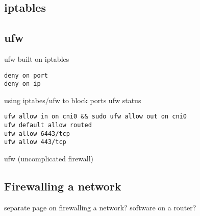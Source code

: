 \subsection{iptables}

\subsection{ufw}
ufw built on iptables

\begin{verbatim}
deny on port
deny on ip
\end{verbatim}
using iptabes/ufw to block ports
ufw status
\begin{verbatim}
ufw allow in on cni0 && sudo ufw allow out on cni0
ufw default allow routed
ufw allow 6443/tcp
ufw allow 443/tcp

\end{verbatim}

ufw (uncomplicated firewall)
\subsection{Firewalling a network}

separate page on firewalling a network? software on a router?

